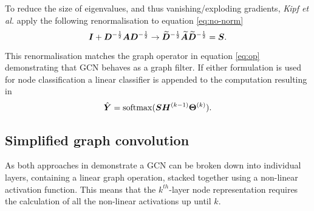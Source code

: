 To reduce the size of eigenvalues, and thus vanishing/exploding gradients, \textit{Kipf et al.}\cite{kipf2016semi} apply the following renormalisation to equation \ref{eq:no-norm} 
\begin{equation}
    \label{eq:norm}
    {\bm{I}} + {\bm{D}}^{-\frac12}{\bm{A}}{\bm{D}}^{-\frac12} \to \widetilde{{\bm{D}}}^{-\frac12}\widetilde{{\bm{A}}}\widetilde{{\bm{D}}}^{-\frac12} = {\bm{S}}.
\end{equation}

This renormalisation matches the graph operator in equation \ref{eq:op} demonstrating that GCN behaves as a graph filter.
If either formulation is used for node classification a linear classifier is appended to the computation resulting in 
\begin{equation}
    \label{eq:cls}
    \hat{{\bm{Y}}} = \operatorname{softmax}({\bm{S}}{\bm{H}}^{(k-1)}\bm{\Theta}^{(k)}).
\end{equation}







\subsection{Simplified graph convolution}
\label{sec:SGC}



As both approaches in  demonstrate a GCN can be broken down into individual layers, containing a linear graph operation, stacked together using a non-linear activation function.
This means that the $k^{th}$-layer node representation requires the calculation of all the non-linear activations up until $k$.

